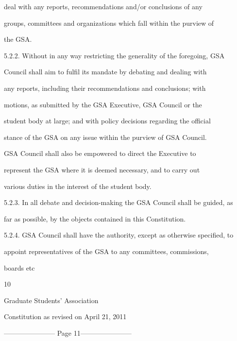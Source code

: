         deal  with  any  reports,  recommendations  and/or  conclusions  of  any  

        groups, committees and organizations which fall within the purview of  

        the GSA.  



5.2.2. Without  in  any  way  restricting  the  generality  of  the  foregoing,  GSA  

        Council  shall  aim  to  fulfil  its  mandate  by  debating  and  dealing  with  

        any  reports,  including  their  recommendations  and  conclusions;  with  

        motions,  as  submitted  by  the  GSA  Executive,  GSA  Council  or  the  

        student body at large; and with policy decisions regarding the official  

        stance of the GSA on any issue within the purview of  GSA Council.  

        GSA  Council  shall  also  be  empowered  to  direct  the  Executive  to  

        represent  the  GSA  where  it  is  deemed  necessary,  and  to  carry  out  

        various duties in the interest of the student body.  



5.2.3. In all debate and decision-making the GSA Council shall be guided, as  

        far as possible, by the objects contained in this Constitution.  



5.2.4. GSA Council shall have the authority, except as otherwise specified, to  

        appoint representatives of the GSA to any committees, commissions,  

        boards etc  



                                                 

                                             10  



                               Graduate Students’ Association  



                          Constitution as revised on April 21, 2011  


----------------------- Page 11-----------------------

